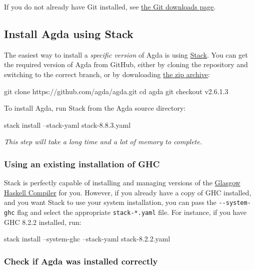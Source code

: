 If you do not already have Git installed, see
\href{https://git-scm.com/downloads}{the Git downloads page}.

\hypertarget{install-agda-using-stack}{%
\subsection{Install Agda using Stack}\label{install-agda-using-stack}}

The easiest way to install a \emph{specific version} of Agda is using
\href{https://docs.haskellstack.org/en/stable/README/}{Stack}. You can
get the required version of Agda from GitHub, either by cloning the
repository and switching to the correct branch, or by downloading
\href{https://github.com/agda/agda/releases/tag/v2.6.1.3}{the zip
archive}:

\begin{myDisplay}
git clone https://github.com/agda/agda.git
cd agda
git checkout v2.6.1.3
\end{myDisplay}

To install Agda, run Stack from the Agda source directory:

\begin{myDisplay}
stack install --stack-yaml stack-8.8.3.yaml
\end{myDisplay}

\emph{This step will take a long time and a lot of memory to complete.}

\hypertarget{using-an-existing-installation-of-ghc}{%
\subsubsection{Using an existing installation of
GHC}\label{using-an-existing-installation-of-ghc}}

Stack is perfectly capable of installing and managing versions of the
\href{https://www.haskell.org/ghc/}{Glasgow Haskell Compiler} for you.
However, if you already have a copy of GHC installed, and you want Stack
to use your system installation, you can pass the
\texttt{-\/-system-ghc} flag and select the appropriate
\texttt{stack-*.yaml} file. For instance, if you have GHC 8.2.2
installed, run:

\begin{myDisplay}
stack install --system-ghc --stack-yaml stack-8.2.2.yaml
\end{myDisplay}

\hypertarget{check-if-agda-was-installed-correctly}{%
\subsubsection{Check if Agda was installed
correctly}\label{check-if-agda-was-installed-correctly}}

